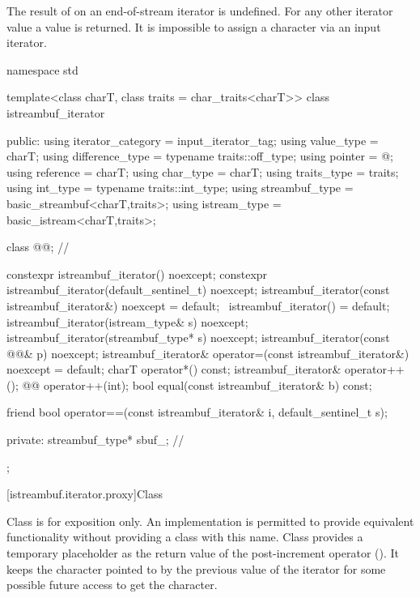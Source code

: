 \pnum
The result of
on an end-of-stream iterator is undefined.
%
For any other iterator value a
value is returned.
It is impossible to assign a character via an input iterator.

%
\begin{codeblock}
namespace std {
  template<class charT, class traits = char_traits<charT>>
  class istreambuf_iterator {
  public:
    using iterator_category = input_iterator_tag;
    using value_type        = charT;
    using difference_type   = typename traits::off_type;
    using pointer           = @\unspec@;
    using reference         = charT;
    using char_type         = charT;
    using traits_type       = traits;
    using int_type          = typename traits::int_type;
    using streambuf_type    = basic_streambuf<charT,traits>;
    using istream_type      = basic_istream<charT,traits>;

    class @@;                          // \expos

    constexpr istreambuf_iterator() noexcept;
    constexpr istreambuf_iterator(default_sentinel_t) noexcept;
    istreambuf_iterator(const istreambuf_iterator&) noexcept = default;
    ~istreambuf_iterator() = default;
    istreambuf_iterator(istream_type& s) noexcept;
    istreambuf_iterator(streambuf_type* s) noexcept;
    istreambuf_iterator(const @@& p) noexcept;
    istreambuf_iterator& operator=(const istreambuf_iterator&) noexcept = default;
    charT operator*() const;
    istreambuf_iterator& operator++();
    @@ operator++(int);
    bool equal(const istreambuf_iterator& b) const;

    friend bool operator==(const istreambuf_iterator& i, default_sentinel_t s);

  private:
    streambuf_type* sbuf_;              // \expos
  };
}
\end{codeblock}

[istreambuf.iterator.proxy]{Class }

\pnum
Class
is for exposition only.
An implementation is permitted to provide equivalent functionality without
providing a class with this name.
Class
provides a temporary
placeholder as the return value of the post-increment operator
().
It keeps the character pointed to by the previous value
of the iterator for some possible future access to get the character.

